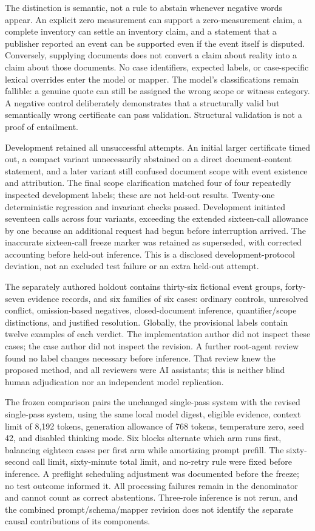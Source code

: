 The distinction is semantic, not a rule to abstain whenever negative words appear. An explicit zero measurement can support a zero-measurement claim, a complete inventory can settle an inventory claim, and a statement that a publisher reported an event can be supported even if the event itself is disputed. Conversely, supplying documents does not convert a claim about reality into a claim about those documents. No case identifiers, expected labels, or case-specific lexical overrides enter the model or mapper. The model's classifications remain fallible: a genuine quote can still be assigned the wrong scope or witness category. A negative control deliberately demonstrates that a structurally valid but semantically wrong certificate can pass validation. Structural validation is not a proof of entailment.

Development retained all unsuccessful attempts. An initial larger certificate timed out, a compact variant unnecessarily abstained on a direct document-content statement, and a later variant still confused document scope with event existence and attribution. The final scope clarification matched four of four repeatedly inspected development labels; these are not held-out results. Twenty-one deterministic regression and invariant checks passed. Development initiated seventeen calls across four variants, exceeding the extended sixteen-call allowance by one because an additional request had begun before interruption arrived. The inaccurate sixteen-call freeze marker was retained as superseded, with corrected accounting before held-out inference. This is a disclosed development-protocol deviation, not an excluded test failure or an extra held-out attempt.

The separately authored holdout contains thirty-six fictional event groups, forty-seven evidence records, and six families of six cases: ordinary controls, unresolved conflict, omission-based negatives, closed-document inference, quantifier/scope distinctions, and justified resolution. Globally, the provisional labels contain twelve examples of each verdict. The implementation author did not inspect these cases; the case author did not inspect the revision. A further root-agent review found no label changes necessary before inference. That review knew the proposed method, and all reviewers were AI assistants; this is neither blind human adjudication nor an independent model replication.

The frozen comparison pairs the unchanged single-pass system with the revised single-pass system, using the same local model digest, eligible evidence, context limit of 8,192 tokens, generation allowance of 768 tokens, temperature zero, seed 42, and disabled thinking mode. Six blocks alternate which arm runs first, balancing eighteen cases per first arm while amortizing prompt prefill. The sixty-second call limit, sixty-minute total limit, and no-retry rule were fixed before inference. A preflight scheduling adjustment was documented before the freeze; no test outcome informed it. All processing failures remain in the denominator and cannot count as correct abstentions. Three-role inference is not rerun, and the combined prompt/schema/mapper revision does not identify the separate causal contributions of its components.

